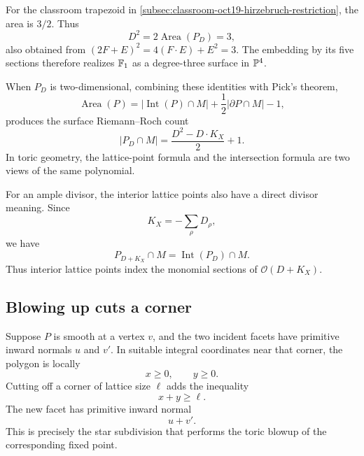 For the classroom trapezoid in
\cref{subsec:classroom-oct19-hirzebruch-restriction}, the area is
\(3/2\). Thus
\[
D^2=2\operatorname{Area}(P_D)=3,
\]
also obtained from \((2F+E)^2=4(F\cdot E)+E^2=3\).
The embedding by its five sections therefore realizes
\(\mathbb{F}_{1}\) as a degree-three surface in \(\mathbb{P}^4\).

When \(P_D\) is two-dimensional, combining these identities with
Pick's theorem,
\[
\operatorname{Area}(P)
=
|\operatorname{Int}(P)\cap M|
+
\frac12|\partial P\cap M|-1,
\]
produces the surface Riemann--Roch count
\[
|P_D\cap M|
=
\frac{D^2-D\cdot K_X}{2}+1.
\]
In toric geometry, the lattice-point formula and the intersection
formula are two views of the same polynomial.

\begin{observation}
For an ample divisor, the interior lattice points also have a direct
divisor meaning. Since
\[
K_X=-\sum_\rho D_\rho,
\]
we have
\[
P_{D+K_X}\cap M
=
\operatorname{Int}(P_D)\cap M.
\]
Thus interior lattice points index the monomial sections of
\(\mathcal O(D+K_X)\).
\end{observation}

\subsection{Blowing up cuts a corner}

Suppose \(P\) is smooth at a vertex \(v\), and the two incident facets
have primitive inward normals \(u\) and \(v'\). In suitable integral
coordinates near that corner, the polygon is locally
\[
x\geq0,
\qquad
y\geq0.
\]
Cutting off a corner of lattice size \(\ell\) adds the inequality
\[
x+y\geq\ell.
\]
The new facet has primitive inward normal
\[
u+v'.
\]
This is precisely the star subdivision that performs the toric blowup
of the corresponding fixed point.

